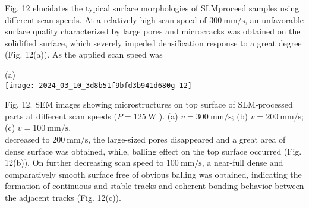 \documentclass[10pt]{article}
\begin{document}
Fig. 12 elucidates the typical surface morphologies of SLMproceed samples using different scan speeds. At a relatively high scan speed of $300 \mathrm{~mm} / \mathrm{s}$, an unfavorable surface quality characterized by large pores and microcracks was obtained on the solidified surface, which severely impeded densification response to a great degree (Fig. 12(a)). As the applied scan speed was

(a)\\
\texttt{[image: 2024\_03\_10\_3d8b51f9bfd3b941d680g-12]}

Fig. 12. SEM images showing microstructures on top surface of SLM-processed parts at different scan speeds $(P=125 \mathrm{~W}$ ). (a) $v=300 \mathrm{~mm} / \mathrm{s}$; (b) $v=200 \mathrm{~mm} / \mathrm{s}$; (c) $v=100 \mathrm{~mm} / \mathrm{s}$.\\
decreased to $200 \mathrm{~mm} / \mathrm{s}$, the large-sized pores disappeared and a great area of dense surface was obtained, while, balling effect on the top surface occurred (Fig. 12(b)). On further decreasing scan speed to $100 \mathrm{~mm} / \mathrm{s}$, a near-full dense and comparatively smooth surface free of obvious balling was obtained, indicating the formation of continuous and stable tracks and coherent bonding behavior between the adjacent tracks (Fig. 12(c)).
\end{document}
